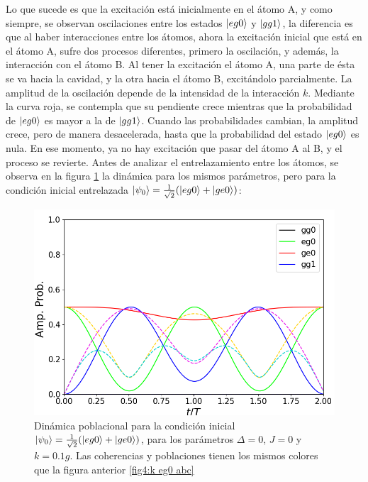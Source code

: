 Lo que sucede es que la excitación está inicialmente en el átomo A, y como siempre, se observan oscilaciones entre los estados $\ket{eg0}$ y $\ket{gg1}$, la diferencia es que al haber interacciones entre los átomos, ahora la excitación inicial que está en el átomo A, sufre dos procesos diferentes, primero la oscilación, y además, la interacción con el átomo B. Al tener la excitación el átomo A, una parte de ésta se va hacia la cavidad, y la otra hacia el átomo B, excitándolo parcialmente. La amplitud de la oscilación depende de la intensidad de la interacción $k$. Mediante la curva roja, se contempla que su pendiente crece mientras que la probabilidad de $\ket{eg0}$ es mayor a la de $\ket{gg1}$. Cuando las probabilidades cambian, la amplitud crece, pero de manera desacelerada, hasta que la probabilidad del estado $\ket{eg0}$ es nula. En ese momento, ya no hay excitación que pasar del átomo A al B, y el proceso se revierte. Antes de analizar el entrelazamiento entre los átomos, se observa en la figura \ref{fig4:k eg0 sim abc} la dinámica para los mismos parámetros, pero para la condición inicial entrelazada $\ket{\psi_0}=\frac{1}{\sqrt{2}}(\ket{eg0}+\ket{ge0})$:
\begin{figure}[h]
    \begin{minipage}[c]{0.67\textwidth}
        \includegraphics[width=\textwidth]{figuras/ch4/k eg0+ ABC.png}
    \end{minipage}\hfill
    \begin{minipage}[c]{0.3\textwidth}
    \caption{Dinámica poblacional para la condición inicial $\ket{\psi_0}=\frac{1}{\sqrt{2}}(\ket{eg0}+\ket{ge0})$, para los parámetros $\Delta=0$, $J=0$ y $k=0.1g$. Las coherencias y poblaciones tienen los mismos colores que la figura anterior \ref{fig4:k eg0 abc}}
    \label{fig4:k eg0 sim abc}
  \end{minipage}
\end{figure}
